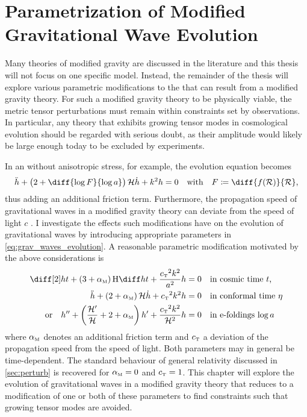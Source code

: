 \documentclass[12pt,parskip=half]{scrreprt}
\newcommand{\addref}{\todo[color=black!20]{ref.}}
\begin{document}



\chapter{Parametrization of Modified Gravitational Wave Evolution}\label{ch:param_mod_grav}

Many theories of modified gravity are discussed in the literature \addref and this thesis will not focus on one specific model. Instead, the remainder of the thesis will explore various parametric modifications to the  that can result from a modified gravity theory. For such a modified gravity theory to be physically viable, the metric tensor perturbations must remain within constraints set by observations. In particular, any theory that exhibits growing tensor modes in cosmological evolution should be regarded with serious doubt, as their amplitude would likely be large enough today to be excluded by experiments.  \addref {}

In an  without anisotropic stress, for example, the evolution equation becomes \citep{Xu2015,Hwang1996} 
\begin{equation}
	\ddconf{h} + \del{2 + \diff{\log{F}}{\efold}} \Hconf \dconf{h} + k^2 h = 0 \quad \text{with} \quad F \defeq \diff{f(\Rscal)}{\Rscal} \eqpunct{,}
\end{equation}
thus adding an additional friction term. Furthermore, the propagation speed of gravitational waves in a modified gravity theory can deviate from the speed of light \(c\) \citep{Amendola2014,Raveri2014}. I investigate the effects such modifications have on the evolution of gravitational waves by introducing appropriate parameters in \eqref{eq:grav_waves_evolution}. A reasonable parametric modification motivated by the above considerations is
\begin{subequations}\label{eq:evolution_friction}
\begin{align}
	\ddt{h} + \del{3 + \alphaM} \Hcosm \dt{h} + \frac{\cT^2 k^2}{a^2} h &= 0 \quad \text{in cosmic time \(t\),} \\
	\ddconf{h} + \del{2 + \alphaM} \Hconf \dconf{h} + \cT^2 k^2 h &= 0 \quad \text{in conformal time \(\conft\)} \\
    \text{or} \quad \ddefold{h} + \del{\frac{\defold{\Hconf}}{\Hconf} + 2 + \alphaM} \defold{h} + \frac{\cT^2 k^2}{\Hconf^2} h &= 0 \quad \text{in e-foldings \(\efold\)}
\end{align}
\end{subequations}
where \({\alpha_{\textnormal{\tiny{M}}}}\) denotes an additional friction term and \({c_{\textnormal{\tiny{T}}}}\) a deviation of the propagation speed from the speed of light. Both parameters may in general be time-dependent. The standard behaviour of general relativity discussed in \autoref{sec:perturb} is recovered for \({\alpha_{\textnormal{\tiny{M}}}}=0\) and \({c_{\textnormal{\tiny{T}}}}=1\). This chapter will explore the evolution of gravitational waves in a modified gravity theory that reduces to a modification of one or both of these parameters to find constraints such that growing tensor modes are avoided.
\end{document}
